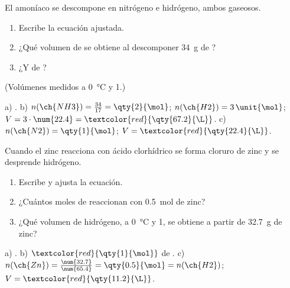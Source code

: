 \begin{exercise}
    El amoníaco se descompone en nitrógeno e hidrógeno, ambos gaseosos.
    \begin{enumerate}[label=\alph*)]
        \item Escribe la ecuación ajustada.
        \item ¿Qué volumen de  se obtiene al descomponer \qty{34}{\gram} de ?
        \item ¿Y de ?
    \end{enumerate}
    (Volúmenes medidos a \qty{0}{\celsius} y \qty{1}{\atm}.)
    \begin{solu}
        a) .
        b) \(n(\ch{NH3}) = \frac{34}{17} = \qty{2}{\mol}\); \(n(\ch{H2}) = 3\,\unit{\mol}\); \(V = 3 \cdot \num{22.4} = \textcolor{red}{\qty{67.2}{\L}}\).
        c) \(n(\ch{N2}) = \qty{1}{\mol}\); \(V = \textcolor{red}{\qty{22.4}{\L}}\).
    \end{solu}
\end{exercise}

\begin{exercise}
    Cuando el zinc reacciona con ácido clorhídrico se forma cloruro de zinc y se desprende hidrógeno.
    \begin{enumerate}[label=\alph*)]
        \item Escribe y ajusta la ecuación.
        \item ¿Cuántos moles de  reaccionan con \qty{0.5}{\mol} de zinc?
        \item ¿Qué volumen de hidrógeno, a \qty{0}{\celsius} y \qty{1}{\atm}, se obtiene a partir de \qty{32.7}{\gram} de zinc?
    \end{enumerate}
    \begin{solu}
        a) . b) \(\textcolor{red}{\qty{1}{\mol}}\) de . c) \(n(\ch{Zn}) = \frac{\num{32.7}}{\num{65.4}} = \qty{0.5}{\mol} = n(\ch{H2})\); \(V = \textcolor{red}{\qty{11.2}{\L}}\).
    \end{solu}
\end{exercise}

